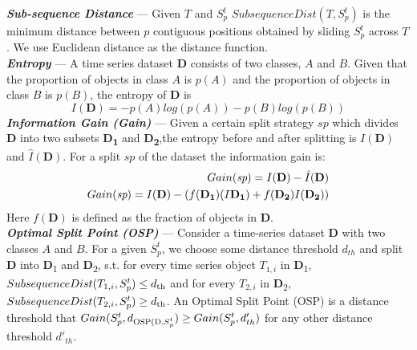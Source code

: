 \documentclass[conference]{IEEEtran}  %
\begin{document}
\enlargeeup
\noindent
\textbf{\textit{Sub-sequence Distance}} --- Given $T$ and $S^t_p$ \(SubsequenceDist(T,S^t_p)\) is the minimum distance between $p$ contiguous positions obtained by sliding $S^t_p$ across $T$. We use Euclidean distance as the distance function.
\smallskip\\
\textbf{\textit{Entropy}} --- A time series dataset \textbf{D} consists of two classes, $A$ and $B$. Given that the proportion of objects in class $A$ is $p(A)$ and the proportion of objects in class $B$ is $p(B)$, the entropy of \textbf{D} is
\begin{equation}
 I(\textbf{D}) = -p(A)log(p(A))  - p(B)log(p(B))
 \label{eq:id}
\end{equation}
\noindent
\textbf{\textit{Information Gain (Gain)}} --- Given a certain split strategy $sp$ which divides \textbf{D} into two subsets \textbf{D\textsubscript{1}} and \textbf{D\textsubscript{2}},the entropy before and after splitting is $I(\textbf{D})$ and $\hat{I}(\textbf{D})$. For a split $sp$ of the dataset the information gain is:
\begin{equation}
\begin{split}
Gain(\textit{sp}) = I(\textbf{D}) - \hat{I}(\textbf{D})\\
Gain(\textit{sp}) = I(\textbf{D}) - (f(\textbf{D\textsubscript{1}})(I\textbf{D\textsubscript{1}})+f(\textbf{D\textsubscript{2}})I(\textbf{D\textsubscript{2}}))
\end{split}
\label{eq:gain}
\end{equation}
Here $f(\textbf{D})$ is defined as the fraction of objects in \textbf{D}. 
\smallskip\\
\textbf{\textit{Optimal Split Point (OSP)}} --- Consider a time-series dataset \textbf{D} with two classes $A$ and $B$. For a given $S^t_p$, we choose some distance threshold $d_{th}$ and split \textbf{D} into \textbf{D}\textsubscript{1} and \textbf{D}\textsubscript{2}, s.t. for every time series object $T_{1,i}$ in \textbf{D}\textsubscript{1}, \(SubsequenceDist(T_{1,i}, S^t_p) \leq d\textsubscript{th}\) and for every $T_{2,i}$ in \textbf{D}\textsubscript{2}, \(SubsequenceDist(T_{2,i}, S^t_p) \geq d\textsubscript{th}\). An Optimal Split Point (OSP) is a distance threshold that \( Gain(S^t_p,d\textsubscript{OSP(D,$S^t_p$}) \geq Gain(S^t_p,d'_{th}) \) for any other distance threshold $d'_{th}$.
\end{document}
